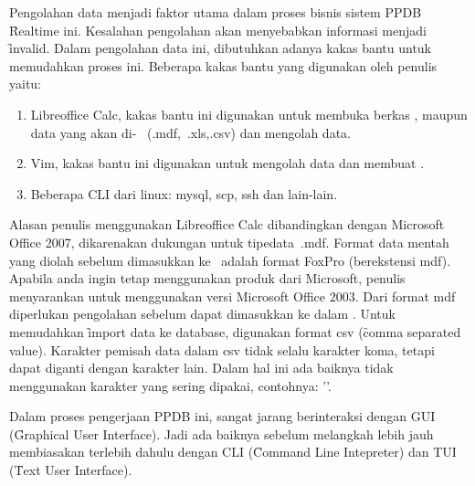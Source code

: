 Pengolahan data menjadi faktor utama dalam proses bisnis sistem PPDB
\f{Realtime} ini. Kesalahan pengolahan akan menyebabkan informasi menjadi
\f{invalid}. Dalam pengolahan data ini, dibutuhkan adanya kakas bantu untuk
memudahkan proses ini.  Beberapa kakas bantu yang digunakan oleh penulis yaitu:

\begin{enumerate} 
    \item Libreoffice Calc, kakas bantu ini digunakan untuk membuka berkas
        \master, maupun data yang akan di- \database~(.mdf,~.xls,.csv) dan
        mengolah data.
    \item Vim, kakas bantu ini digunakan untuk mengolah data dan membuat \script.
    \item Beberapa CLI dari linux: mysql, scp, ssh dan lain-lain.
\end{enumerate}

Alasan penulis menggunakan Libreoffice Calc dibandingkan dengan Microsoft
Office 2007, dikarenakan dukungan untuk tipedata~.mdf. Format data mentah yang
diolah sebelum dimasukkan ke \database~adalah format FoxPro (berekstensi mdf).
Apabila anda ingin tetap menggunakan produk dari Microsoft, penulis menyarankan
untuk menggunakan versi Microsoft Office 2003. Dari format mdf diperlukan
pengolahan sebelum dapat dimasukkan ke dalam \database. Untuk memudahkan
\f{import} data ke database, digunakan format csv (\f{comma separated value}).
Karakter pemisah data dalam csv tidak selalu karakter koma, tetapi dapat
diganti dengan karakter lain. Dalam hal ini ada baiknya tidak menggunakan
karakter yang sering dipakai, contohnya: '\textbar'.

Dalam proses pengerjaan PPDB ini, sangat jarang berinteraksi dengan GUI
(\f{Graphical User Interface}). Jadi ada baiknya sebelum melangkah lebih jauh
membiasakan terlebih dahulu dengan CLI (\f{Command Line Intepreter}) dan TUI
(\f{Text User Interface}).

